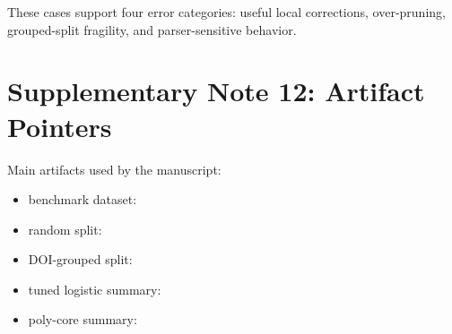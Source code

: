 \documentclass{article}
\begin{document}
These cases support four error categories: useful local corrections, over-pruning, grouped-split fragility, and parser-sensitive behavior.

\section{Supplementary Note 12: Artifact Pointers}

Main artifacts used by the manuscript:

\begin{itemize}
\item benchmark dataset: 
\item random split: 
\item DOI-grouped split: 
\item tuned logistic summary: 
\item poly-core summary: 
\end{itemize}
\end{document}
